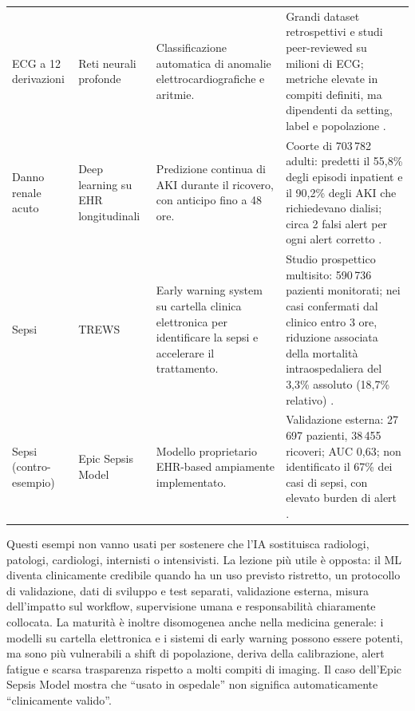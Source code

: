 \documentclass[11pt,a4paper]{article}
\begin{document}
\begin{longtable}{>{\RaggedRight}p{2.1cm} >{\RaggedRight}p{2.4cm} >{\RaggedRight}p{4.0cm} >{\RaggedRight}p{5.3cm}}
\addlinespace
\small ECG a 12 derivazioni & \small Reti neurali profonde & \small Classificazione automatica di anomalie elettrocardiografiche e aritmie. & \small Grandi dataset retrospettivi e studi peer-reviewed su milioni di ECG; metriche elevate in compiti definiti, ma dipendenti da setting, label e popolazione \cite{ribeiro2020}. \\
\addlinespace
\small Danno renale acuto & \small Deep learning su EHR longitudinali & \small Predizione continua di AKI durante il ricovero, con anticipo fino a 48 ore. & \small Coorte di 703\,782 adulti: predetti il 55,8\% degli episodi inpatient e il 90,2\% degli AKI che richiedevano dialisi; circa 2 falsi alert per ogni alert corretto \cite{tomasev2019}. \\
\addlinespace
\small Sepsi & \small TREWS & \small Early warning system su cartella clinica elettronica per identificare la sepsi e accelerare il trattamento. & \small Studio prospettico multisito: 590\,736 pazienti monitorati; nei casi confermati dal clinico entro 3 ore, riduzione associata della mortalità intraospedaliera del 3,3\% assoluto (18,7\% relativo) \cite{adams2022}. \\
\addlinespace
\small Sepsi (contro-esempio) & \small Epic Sepsis Model & \small Modello proprietario EHR-based ampiamente implementato. & \small Validazione esterna: 27\,697 pazienti, 38\,455 ricoveri; AUC 0,63; non identificato il 67\% dei casi di sepsi, con elevato burden di alert \cite{wong2021}. \\
\end{longtable}

Questi esempi non vanno usati per sostenere che l'IA sostituisca radiologi, patologi, cardiologi, internisti o intensivisti. La lezione più utile è opposta: il ML diventa clinicamente credibile quando ha un uso previsto ristretto, un protocollo di validazione, dati di sviluppo e test separati, validazione esterna, misura dell'impatto sul workflow, supervisione umana e responsabilità chiaramente collocata. La maturità è inoltre disomogenea anche nella medicina generale: i modelli su cartella elettronica e i sistemi di early warning possono essere potenti, ma sono più vulnerabili a shift di popolazione, deriva della calibrazione, alert fatigue e scarsa trasparenza rispetto a molti compiti di imaging. Il caso dell'Epic Sepsis Model \cite{wong2021} mostra che ``usato in ospedale'' non significa automaticamente ``clinicamente valido''.

\end{document}
